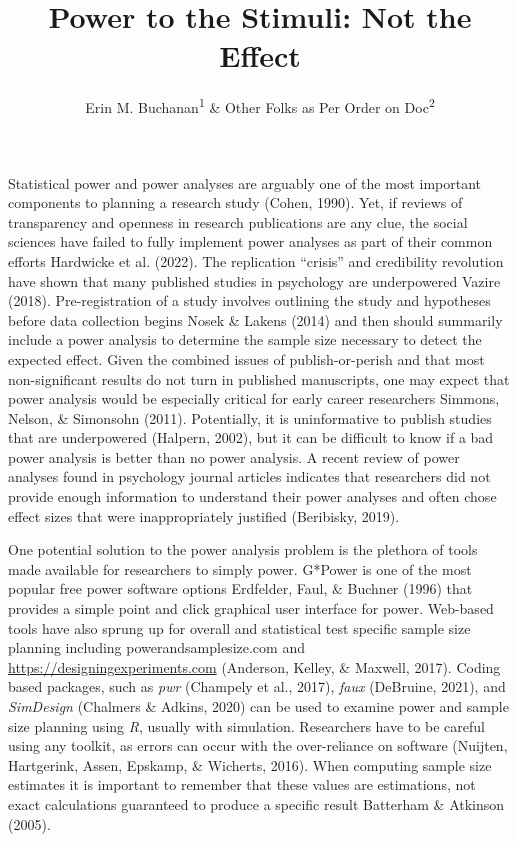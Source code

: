 \documentclass[
  man]{apa6}
\title{Power to the Stimuli: Not the Effect}
\author{Erin M. Buchanan\textsuperscript{1} \& Other Folks as Per Order on Doc\textsuperscript{2}}
\date{}
\affiliation{\vspace{0.5cm}\textsuperscript{1} Harrisburg University of Science and Technology\\\textsuperscript{2} Other Instituions}
\begin{document}
\maketitle

Statistical power and power analyses are arguably one of the most important components to planning a research study (Cohen, 1990). Yet, if reviews of transparency and openness in research publications are any clue, the social sciences have failed to fully implement power analyses as part of their common efforts Hardwicke et al. (2022). The replication ``crisis'' and credibility revolution have shown that many published studies in psychology are underpowered Vazire (2018). Pre-registration of a study involves outlining the study and hypotheses before data collection begins Nosek \& Lakens (2014) and then should summarily include a power analysis to determine the sample size necessary to detect the expected effect. Given the combined issues of publish-or-perish and that most non-significant results do not turn in published manuscripts, one may expect that power analysis would be especially critical for early career researchers Simmons, Nelson, \& Simonsohn (2011). Potentially, it is uninformative to publish studies that are underpowered (Halpern, 2002), but it can be difficult to know if a bad power analysis is better than no power analysis. A recent review of power analyses found in psychology journal articles indicates that researchers did not provide enough information to understand their power analyses and often chose effect sizes that were inappropriately justified (Beribisky, 2019).

One potential solution to the power analysis problem is the plethora of tools made available for researchers to simply power. G*Power is one of the most popular free power software options Erdfelder, Faul, \& Buchner (1996) that provides a simple point and click graphical user interface for power. Web-based tools have also sprung up for overall and statistical test specific sample size planning including powerandsamplesize.com and \url{https://designingexperiments.com} (Anderson, Kelley, \& Maxwell, 2017). Coding based packages, such as \emph{pwr} (Champely et al., 2017), \emph{faux} (DeBruine, 2021), and \emph{SimDesign} (Chalmers \& Adkins, 2020) can be used to examine power and sample size planning using \emph{R}, usually with simulation. Researchers have to be careful using any toolkit, as errors can occur with the over-reliance on software (Nuijten, Hartgerink, Assen, Epskamp, \& Wicherts, 2016). When computing sample size estimates it is important to remember that these values are estimations, not exact calculations guaranteed to produce a specific result Batterham \& Atkinson (2005).
\end{document}
